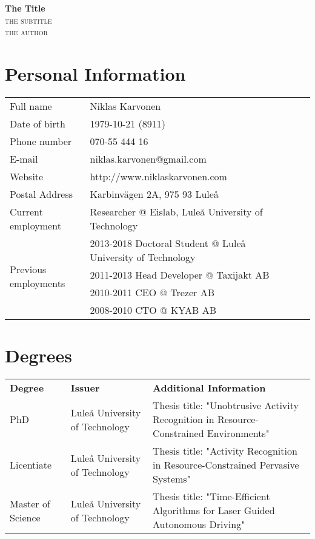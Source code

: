 \documentclass{article}
\makeatletter
\newlength\drop
\newcommand*\titleM{\begingroup%
\setlength\drop{0.08\textheight}
\centering
\vspace*{\drop}
{\Huge\bfseries The Title}\\[\baselineskip]
{\scshape the subtitle}\\[\baselineskip]
\vfill
{\large\scshape the author}\par
\vfill
{\scshape \@date}\par
\vspace*{2\drop}
\endgroup}
\makeatother
\begin{document}
\begin{titlingpage}
\titleM
\end{titlingpage}

\tableofcontents
\newpage

\section{Personal Information}

\begin{table}[ht]
\begin{tabular}[t]{lllll}
Full name & Niklas Karvonen  \\
Date of birth & 1979-10-21 (8911) \\
Phone number & 070-55 444 16 \\ 
E-mail & niklas.karvonen@gmail.com \\
Website & http://www.niklaskarvonen.com \\
Postal Address & Karbinvägen 2A, 975 93 Luleå \\
Current employment & Researcher @ Eislab, Luleå University of Technology \\
\multirow[t]{4}{*}{Previous employments}
& 2013-2018 Doctoral Student @ Luleå University of Technology \\
& 2011-2013 Head Developer @ Taxijakt AB \\
& 2010-2011 CEO @ Trezer AB \\
& 2008-2010 CTO @ KYAB AB \\
\end{tabular}
\end{table}
\newpage

\section{Degrees}
\begin{table}[ht]
\begin{tabular}[t]{p{3cm}p{5cm}p{5cm}}
\textbf{Degree} & \textbf{Issuer} & \textbf{Additional Information}\\
PhD & Luleå University of Technology & Thesis title: "Unobtrusive Activity Recognition in Resource-Constrained Environments" \\
Licentiate & Luleå University of Technology & Thesis title: "Activity Recognition in Resource-Constrained Pervasive Systems" \\
Master of Science & Luleå University of Technology & Thesis title: "Time-Efficient Algorithms for Laser Guided Autonomous Driving" \\
\end{tabular}
\end{table}
\end{document}

